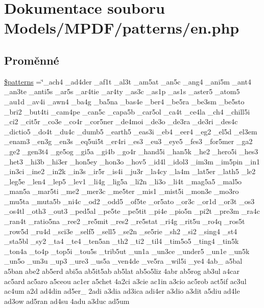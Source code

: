 \hypertarget{en_8php}{\section{Dokumentace souboru Models/\-M\-P\-D\-F/patterns/en.php}
\label{en_8php}
}
\subsection*{Proměnné}
\begin{DoxyCompactItemize}
\item 
\hyperlink{en_8php_a99c668c59ad650ca9b31ad5313dc5720}{\$patterns} =\char`\"{}\-\_\-ach4 \-\_\-ad4der \-\_\-af1t \-\_\-al3t \-\_\-am5at \-\_\-an5c \-\_\-ang4 \-\_\-ani5m \-\_\-ant4 \-\_\-an3te \-\_\-anti5s \-\_\-ar5s \-\_\-ar4tie \-\_\-ar4ty \-\_\-as3c \-\_\-as1p \-\_\-as1s \-\_\-aster5 \-\_\-atom5 \-\_\-au1d \-\_\-av4i \-\_\-awn4 \-\_\-ba4g \-\_\-ba5na \-\_\-bas4e \-\_\-ber4 \-\_\-be5ra \-\_\-be3sm \-\_\-be5sto \-\_\-bri2 \-\_\-but4ti \-\_\-cam4pe \-\_\-can5c \-\_\-capa5b \-\_\-car5ol \-\_\-ca4t \-\_\-ce4la \-\_\-ch4 \-\_\-chill5i \-\_\-ci2 \-\_\-cit5r \-\_\-co3e \-\_\-co4r \-\_\-cor5ner \-\_\-de4moi \-\_\-de3o \-\_\-de3ra \-\_\-de3ri \-\_\-des4c \-\_\-dictio5 \-\_\-do4t \-\_\-du4c \-\_\-dumb5 \-\_\-earth5 \-\_\-eas3i \-\_\-eb4 \-\_\-eer4 \-\_\-eg2 \-\_\-el5d \-\_\-el3em \-\_\-enam3 \-\_\-en3g \-\_\-en3s \-\_\-eq5ui5t \-\_\-er4ri \-\_\-es3 \-\_\-eu3 \-\_\-eye5 \-\_\-fes3 \-\_\-for5mer \-\_\-ga2 \-\_\-ge2 \-\_\-gen3t4 \-\_\-ge5og \-\_\-gi5a \-\_\-gi4b \-\_\-go4r \-\_\-hand5i \-\_\-han5k \-\_\-he2 \-\_\-hero5i \-\_\-hes3 \-\_\-het3 \-\_\-hi3b \-\_\-hi3er \-\_\-hon5ey \-\_\-hon3o \-\_\-hov5 \-\_\-id4l \-\_\-idol3 \-\_\-im3m \-\_\-im5pin \-\_\-in1 \-\_\-in3ci \-\_\-ine2 \-\_\-in2k \-\_\-in3s \-\_\-ir5r \-\_\-is4i \-\_\-ju3r \-\_\-la4cy \-\_\-la4m \-\_\-lat5er \-\_\-lath5 \-\_\-le2 \-\_\-leg5e \-\_\-len4 \-\_\-lep5 \-\_\-lev1 \-\_\-li4g \-\_\-lig5a \-\_\-li2n \-\_\-li3o \-\_\-li4t \-\_\-mag5a5 \-\_\-mal5o \-\_\-man5a \-\_\-mar5ti \-\_\-me2 \-\_\-mer3c \-\_\-me5ter \-\_\-mis1 \-\_\-mist5i \-\_\-mon3e \-\_\-mo3ro \-\_\-mu5ta \-\_\-muta5b \-\_\-ni4c \-\_\-od2 \-\_\-odd5 \-\_\-of5te \-\_\-or5ato \-\_\-or3c \-\_\-or1d \-\_\-or3t \-\_\-os3 \-\_\-os4tl \-\_\-oth3 \-\_\-out3 \-\_\-ped5al \-\_\-pe5te \-\_\-pe5tit \-\_\-pi4e \-\_\-pio5n \-\_\-pi2t \-\_\-pre3m \-\_\-ra4c \-\_\-ran4t \-\_\-ratio5na \-\_\-ree2 \-\_\-re5mit \-\_\-res2 \-\_\-re5stat \-\_\-ri4g \-\_\-rit5u \-\_\-ro4q \-\_\-ros5t \-\_\-row5d \-\_\-ru4d \-\_\-sci3e \-\_\-self5 \-\_\-sell5 \-\_\-se2n \-\_\-se5rie \-\_\-sh2 \-\_\-si2 \-\_\-sing4 \-\_\-st4 \-\_\-sta5bl \-\_\-sy2 \-\_\-ta4 \-\_\-te4 \-\_\-ten5an \-\_\-th2 \-\_\-ti2 \-\_\-til4 \-\_\-tim5o5 \-\_\-ting4 \-\_\-tin5k \-\_\-ton4a \-\_\-to4p \-\_\-top5i \-\_\-tou5s \-\_\-trib5ut \-\_\-un1a \-\_\-un3ce \-\_\-under5 \-\_\-un1e \-\_\-un5k \-\_\-un5o \-\_\-un3u \-\_\-up3 \-\_\-ure3 \-\_\-us5a \-\_\-ven4de \-\_\-ve5ra \-\_\-wil5i \-\_\-ye4 4ab\-\_\- a5bal a5ban abe2 ab5erd abi5a ab5it5ab ab5lat ab5o5liz 4abr ab5rog ab3ul a4car ac5ard ac5aro a5ceou ac1er a5chet 4a2ci a3cie ac1in a3cio ac5rob act5if ac3ul ac4um a2d ad4din ad5er\-\_\- 2adi a3dia ad3ica adi4er a3dio a3dit a5diu ad4le ad3ow ad5ran ad4su 4adu a3duc ad5um 
\end{DoxyCompactItemize}
